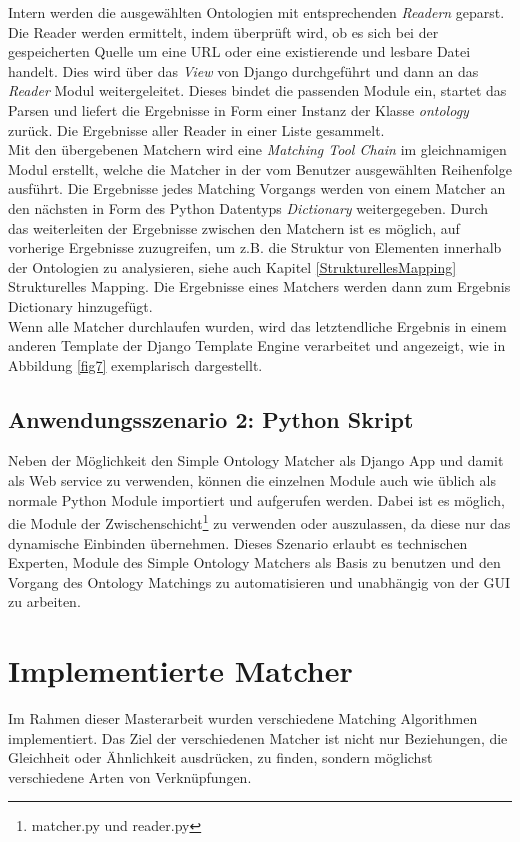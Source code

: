 		Intern werden die ausgewählten Ontologien mit entsprechenden
		\textit{Readern} geparst. Die Reader werden ermittelt, indem überprüft wird,
		ob es sich bei der gespeicherten Quelle um eine URL oder eine
		existierende und lesbare Datei handelt. Dies wird über das \textit{View} von
		Django durchgeführt und dann an das \textit{Reader} Modul weitergeleitet. Dieses
		bindet die passenden Module ein, startet das Parsen und liefert die Ergebnisse
		in Form einer Instanz der Klasse \textit{ontology} zurück. Die Ergebnisse
		aller Reader in einer Liste gesammelt.\\
		Mit den übergebenen Matchern wird eine \textit{Matching Tool Chain} im
		gleichnamigen Modul erstellt, welche die Matcher in der vom
		Benutzer ausgewählten Reihenfolge ausführt. Die Ergebnisse jedes Matching
		Vorgangs werden von einem Matcher an den nächsten in Form des Python Datentyps \textit{Dictionary}
		weitergegeben. Durch das weiterleiten der Ergebnisse zwischen den Matchern
		ist es möglich, auf vorherige Ergebnisse zuzugreifen, um z.B. die Struktur von
		Elementen innerhalb der Ontologien zu analysieren,
		siehe auch Kapitel \ref{StrukturellesMapping} Strukturelles Mapping.
		Die Ergebnisse eines Matchers werden dann zum Ergebnis Dictionary
		hinzugefügt.\\
		Wenn alle Matcher durchlaufen wurden, wird das letztendliche Ergebnis in einem
		anderen Template der Django Template Engine verarbeitet und angezeigt,
		wie in Abbildung \ref{fig7} exemplarisch dargestellt.
		
		\subsection{Anwendungsszenario 2: Python Skript}
		Neben der Möglichkeit den Simple Ontology Matcher als Django App und damit als
		Web service zu verwenden, können die einzelnen Module auch wie üblich als
		normale Python Module importiert und aufgerufen werden. Dabei ist es möglich, die Module der
		Zwischenschicht\footnote{matcher.py und reader.py} zu verwenden oder
		auszulassen, da diese nur das dynamische Einbinden übernehmen. Dieses
		Szenario erlaubt es technischen Experten, Module des Simple Ontology Matchers
		als Basis zu benutzen und den Vorgang des Ontology Matchings zu
		automatisieren und unabhängig von der GUI zu arbeiten.
		
		\section{Implementierte Matcher}
		\label{ImplementierteMatcher}
		Im Rahmen dieser Masterarbeit wurden verschiedene Matching Algorithmen
		implementiert. Das Ziel der verschiedenen Matcher ist nicht nur Beziehungen,
		die Gleichheit oder Ähnlichkeit ausdrücken, zu finden, sondern möglichst
		verschiedene Arten von Verknüpfungen.
		
